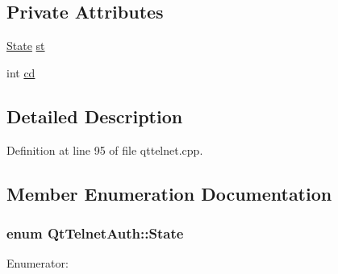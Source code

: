 \subsection*{Private Attributes}
\begin{DoxyCompactItemize}
\item 
\hyperlink{classQtTelnetAuth_aef4fcfe1cf60491f566b31c7f8f8f2f2}{State} \hyperlink{classQtTelnetAuth_a38da91878419c68ec79384b5d75b3908}{st}
\item 
int \hyperlink{classQtTelnetAuth_a708030f5805da6a12876c6cbab24dacc}{cd}
\end{DoxyCompactItemize}


\subsection{Detailed Description}


Definition at line 95 of file qttelnet.cpp.



\subsection{Member Enumeration Documentation}
\hypertarget{classQtTelnetAuth_aef4fcfe1cf60491f566b31c7f8f8f2f2}{
\subsubsection[{State}]{\setlength{\rightskip}{0pt plus 5cm}enum {\bf QtTelnetAuth::State}}}
\label{classQtTelnetAuth_aef4fcfe1cf60491f566b31c7f8f8f2f2}
\begin{Desc}
\item[Enumerator: ]\par
\begin{description}
\item[{\em 
\hypertarget{classQtTelnetAuth_aef4fcfe1cf60491f566b31c7f8f8f2f2ae72cd9a5978207fc7d62288158e389ef}{
AuthIntermediate}
\label{classQtTelnetAuth_aef4fcfe1cf60491f566b31c7f8f8f2f2ae72cd9a5978207fc7d62288158e389ef}
}]\item[{\em 
\hypertarget{classQtTelnetAuth_aef4fcfe1cf60491f566b31c7f8f8f2f2ae0795bd80ac1a018650ae5a13cb0720a}{
AuthSuccess}
\label{classQtTelnetAuth_aef4fcfe1cf60491f566b31c7f8f8f2f2ae0795bd80ac1a018650ae5a13cb0720a}
}]\item[{\em 
\hypertarget{classQtTelnetAuth_aef4fcfe1cf60491f566b31c7f8f8f2f2a31851366016c0a5fd364675c9a727def}{
AuthFailure}
\label{classQtTelnetAuth_aef4fcfe1cf60491f566b31c7f8f8f2f2a31851366016c0a5fd364675c9a727def}
}]\end{description}
\end{Desc}



